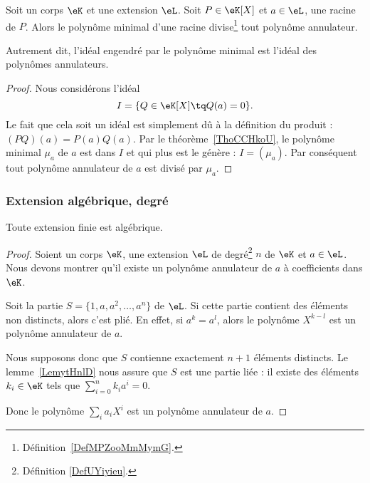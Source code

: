 \begin{proposition}\label{PropXULooPCusvE}
    Soit un corps \( \eK\) et une extension \( \eL\). Soit \( P\in \eK[X]\) et  \( a\in \eL\), une racine de \( P\). Alors le polynôme minimal d'une racine divise\footnote{Définition~\ref{DefMPZooMmMymG}.} tout polynôme annulateur.

    Autrement dit, l'idéal engendré par le polynôme minimal est l'idéal des polynômes annulateurs.
\end{proposition}

\begin{proof}
    Nous considérons l'idéal
    \begin{equation}
        I=\{ Q\in \eK[X]\tq Q(a)=0 \}.
    \end{equation}
    Le fait que cela soit un idéal est simplement dû à la définition du produit : \( (PQ)(a)=P(a)Q(a)\). Par le théorème~\ref{ThoCCHkoU}, le polynôme minimal \( \mu_a\) de \( a\) est dans \( I\) et qui plus est le génère : \( I=(\mu_a)\). Par conséquent tout polynôme annulateur de \( a\) est divisé par \( \mu_a\).
\end{proof}

\subsubsection{Extension algébrique, degré}

\begin{proposition}
    Toute extension finie est algébrique.
\end{proposition}

\begin{proof}
    Soient un corps \( \eK\), une extension \( \eL\) de degré\footnote{Définition \ref{DefUYiyieu}.} \( n\) de \( \eK\) et \( a\in \eL\). Nous devons montrer qu'il existe un polynôme annulateur de \( a\) à coefficients dans \( \eK\).

    Soit la partie \( S=\{1,a,a^2,\ldots, a^n\}\) de \( \eL\). Si cette partie contient des éléments non distincts, alors c'est plié. En effet, si \( a^k=a^l\), alors le polynôme \( X^{k-l}\) est un polynôme annulateur de \( a\).

    Nous supposons donc que \( S\) contienne exactement \( n+1\) éléments distincts. Le lemme~\ref{LemytHnlD} nous assure que \( S\) est une partie liée : il existe des éléments \( k_i\in \eK\) tels que \( \sum_{i=0}^nk_ia^i=0\).

    Donc le polynôme \( \sum_ia_iX^i\) est un polynôme annulateur de \( a\).
\end{proof}

